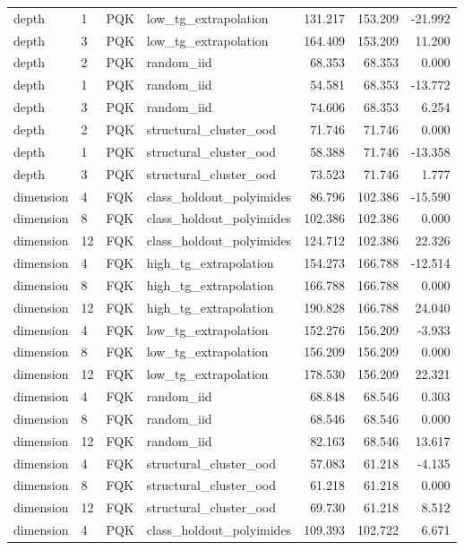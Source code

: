 \begin{tabular}{llllrrr}
depth & 1 & PQK & low\_tg\_extrapolation & 131.217 & 153.209 & -21.992 \\
depth & 3 & PQK & low\_tg\_extrapolation & 164.409 & 153.209 & 11.200 \\
depth & 2 & PQK & random\_iid & 68.353 & 68.353 & 0.000 \\
depth & 1 & PQK & random\_iid & 54.581 & 68.353 & -13.772 \\
depth & 3 & PQK & random\_iid & 74.606 & 68.353 & 6.254 \\
depth & 2 & PQK & structural\_cluster\_ood & 71.746 & 71.746 & 0.000 \\
depth & 1 & PQK & structural\_cluster\_ood & 58.388 & 71.746 & -13.358 \\
depth & 3 & PQK & structural\_cluster\_ood & 73.523 & 71.746 & 1.777 \\
dimension & 4 & FQK & class\_holdout\_polyimides & 86.796 & 102.386 & -15.590 \\
dimension & 8 & FQK & class\_holdout\_polyimides & 102.386 & 102.386 & 0.000 \\
dimension & 12 & FQK & class\_holdout\_polyimides & 124.712 & 102.386 & 22.326 \\
dimension & 4 & FQK & high\_tg\_extrapolation & 154.273 & 166.788 & -12.514 \\
dimension & 8 & FQK & high\_tg\_extrapolation & 166.788 & 166.788 & 0.000 \\
dimension & 12 & FQK & high\_tg\_extrapolation & 190.828 & 166.788 & 24.040 \\
dimension & 4 & FQK & low\_tg\_extrapolation & 152.276 & 156.209 & -3.933 \\
dimension & 8 & FQK & low\_tg\_extrapolation & 156.209 & 156.209 & 0.000 \\
dimension & 12 & FQK & low\_tg\_extrapolation & 178.530 & 156.209 & 22.321 \\
dimension & 4 & FQK & random\_iid & 68.848 & 68.546 & 0.303 \\
dimension & 8 & FQK & random\_iid & 68.546 & 68.546 & 0.000 \\
dimension & 12 & FQK & random\_iid & 82.163 & 68.546 & 13.617 \\
dimension & 4 & FQK & structural\_cluster\_ood & 57.083 & 61.218 & -4.135 \\
dimension & 8 & FQK & structural\_cluster\_ood & 61.218 & 61.218 & 0.000 \\
dimension & 12 & FQK & structural\_cluster\_ood & 69.730 & 61.218 & 8.512 \\
dimension & 4 & PQK & class\_holdout\_polyimides & 109.393 & 102.722 & 6.671 \\

\end{tabular}
